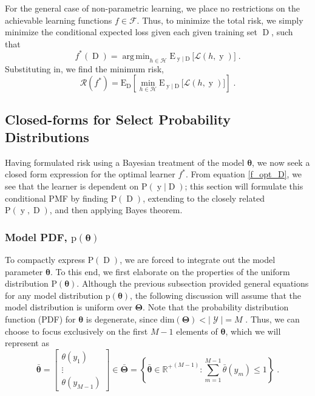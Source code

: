 \documentclass[12pt]{report}
\DeclareMathOperator*{\argmin}{arg\,min}
\DeclareMathOperator{\yrm}{\mathrm{y}}
\DeclareMathOperator{\Drm}{\mathrm{D}}
\DeclareMathOperator{\Ycal}{\mathcal{Y}}
\begin{document}
For the general case of non-parametric learning, we place no restrictions on the achievable learning functions $f \in \mathcal{F}$. Thus, to minimize the total risk, we simply minimize the conditional expected loss given each given training set $\Drm$, such that
\begin{equation} \label{f_opt_D}
f^*(\Drm) = \argmin_{h \in \mathcal{H}} \text{E}_{\yrm | \Drm}\big[ \mathcal{L}(h,\yrm) \big] \;.
\end{equation}
Substituting in, we find the minimum risk,
\begin{equation} \label{risk_min}
\mathcal{R}(f^*) = \text{E}_{\Drm} \left[ \min_{h \in \mathcal{H}} \text{E}_{\yrm | \Drm}\big[ \mathcal{L}(h,\yrm) \big] \right] \;.
\end{equation}




\subsection{Closed-forms for Select Probability Distributions}

Having formulated risk using a Bayesian treatment of the model $\bm{\theta}$, we now seek a closed form expression for the optimal learner $f^*$. From equation \eqref{f_opt_D}, we see that the learner is dependent on $\text{P}(\yrm | \Drm)$; this section will formulate this conditional PMF by finding $\text{P}(\Drm)$, extending to the closely related $\text{P}(\yrm,\Drm)$, and then applying Bayes theorem.


\subsubsection{Model PDF, $\text{p}(\bm{\theta})$}

To compactly express $\text{P}(\Drm)$, we are forced to integrate out the model parameter $\bm{\theta}$. To this end, we first elaborate on the properties of the uniform distribution $\text{P}(\bm{\theta})$. Although the previous subsection provided general equations for any model distribution $\text{p}(\bm{\theta})$, the following discussion will assume that the model distribution is uniform over $\bm{\Theta}$. Note that the probability distribution function (PDF) for $\bm{\theta}$ is degenerate, since $\text{dim}(\bm{\Theta}) < |\Ycal| = M$ . Thus, we can choose to focus exclusively on the first $M-1$ elements of $\bm{\theta}$, which we will represent as
\begin{equation}
\bar{\bm{\theta}} = \begin{bmatrix} \theta(y_1) \\ \vdots \\ \theta(y_{M-1}) \end{bmatrix} \in \bar{\bm{\Theta}} = \left\{ \bar{\bm{\theta}} \in {\mathbb{R}^+}^{(M-1)}: \sum_{m=1}^{M-1} \bar{\theta}(y_m) \leq 1 \right\} \;.
\end{equation}
\end{document}
